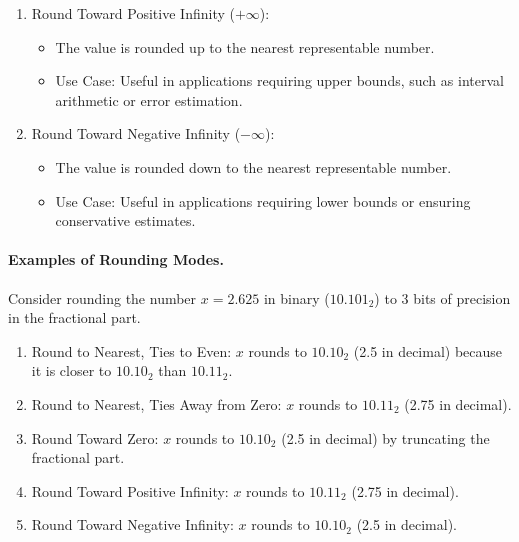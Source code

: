 \begin{enumerate}
    \item Round Toward Positive Infinity (\(+\infty\)):
    \begin{itemize}
        \item The value is rounded up to the nearest representable number.
        \item Use Case: Useful in applications requiring upper bounds, such as interval arithmetic or error estimation.
    \end{itemize}
    
    \item Round Toward Negative Infinity (\(-\infty\)):
    \begin{itemize}
        \item The value is rounded down to the nearest representable number.
        \item Use Case: Useful in applications requiring lower bounds or ensuring conservative estimates.
    \end{itemize}
\end{enumerate}

\paragraph{Examples of Rounding Modes.}
Consider rounding the number \( x = 2.625 \) in binary (\( 10.101_2 \)) to 3 bits of precision in the fractional part.

\begin{enumerate}
    \item Round to Nearest, Ties to Even:
     \( x \) rounds to \( 10.10_2 \) (2.5 in decimal) because it is closer to \( 10.10_2 \) than \( 10.11_2 \).
    \item Round to Nearest, Ties Away from Zero:
     \( x \) rounds to \( 10.11_2 \) (2.75 in decimal).
    \item Round Toward Zero:
     \( x \) rounds to \( 10.10_2 \) (2.5 in decimal) by truncating the fractional part.
    \item Round Toward Positive Infinity:
     \( x \) rounds to \( 10.11_2 \) (2.75 in decimal).
    \item Round Toward Negative Infinity:
     \( x \) rounds to \( 10.10_2 \) (2.5 in decimal).
\end{enumerate}


